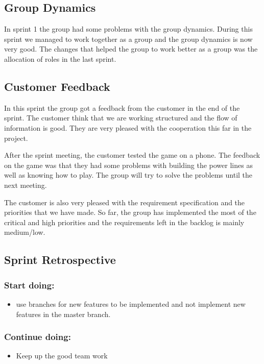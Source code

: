 \subsection{Group Dynamics}
	In sprint 1 the group had some problems with the group dynamics. 
	During this sprint we managed to work together as a group and the group dynamics
	is now very good. The changes that helped the group to work better as a group
	was the allocation of roles in the last sprint. 

\subsection{Customer Feedback}
	In this sprint the group got a feedback from the customer in the end of the sprint.
	The customer think that we are working structured and the flow of information is good.
	They are very pleased with the cooperation this far in the project.

	After the sprint meeting, the customer tested the game on a phone. The feedback on the game
	was that they had some problems with building the power lines as well as knowing how to play.
	The group will try to solve the problems until the next meeting.

	The customer is also very pleased with the requirement specification and the priorities
	that we have made. So far, the group has implemented the most of the critical and high
	priorities and the requirements left in the backlog is mainly medium/low. 

\subsection{Sprint Retrospective}
	\subsubsection*{Start doing: } 
		\begin{itemize}
			\item use branches for new features to be implemented and not implement new 
			features in the master branch.
		\end{itemize}
	\subsubsection*{Continue doing: }
		\begin{itemize}
			\item Keep up the good team work
		\end{itemize}

